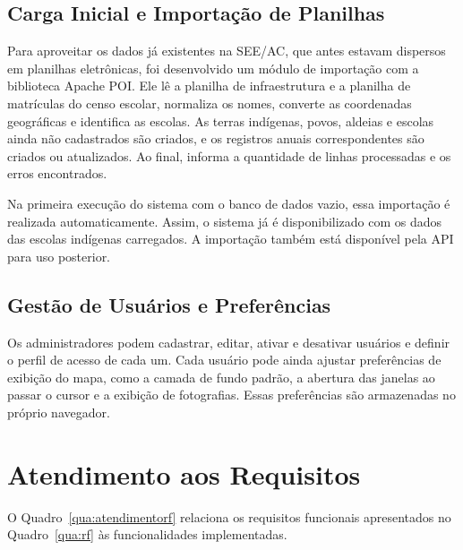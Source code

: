 \subsection{Carga Inicial e Importação de Planilhas}

Para aproveitar os dados já existentes na SEE/AC, que antes estavam dispersos em planilhas eletrônicas, foi desenvolvido um módulo de importação com a biblioteca Apache POI. Ele lê a planilha de infraestrutura e a planilha de matrículas do censo escolar, normaliza os nomes, converte as coordenadas geográficas e identifica as escolas. As terras indígenas, povos, aldeias e escolas ainda não cadastrados são criados, e os registros anuais correspondentes são criados ou atualizados. Ao final, informa a quantidade de linhas processadas e os erros encontrados.

Na primeira execução do sistema com o banco de dados vazio, essa importação é realizada automaticamente. Assim, o sistema já é disponibilizado com os dados das escolas indígenas carregados. A importação também está disponível pela API para uso posterior.

\subsection{Gestão de Usuários e Preferências}

Os administradores podem cadastrar, editar, ativar e desativar usuários e definir o perfil de acesso de cada um. Cada usuário pode ainda ajustar preferências de exibição do mapa, como a camada de fundo padrão, a abertura das janelas ao passar o cursor e a exibição de fotografias. Essas preferências são armazenadas no próprio navegador.

\section{Atendimento aos Requisitos}

O Quadro~\ref{qua:atendimentorf} relaciona os requisitos funcionais apresentados no Quadro~\ref{qua:rf} às funcionalidades implementadas.

